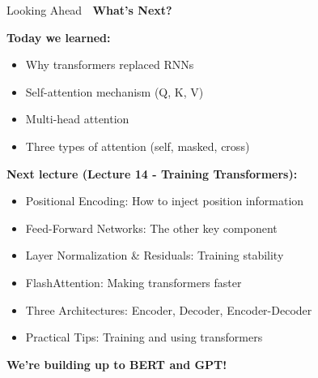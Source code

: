 \documentclass[aspectratio=169]{beamer}
\begin{document}
\begin{frame}[shrink=10]{Looking Ahead 🔮}
\textbf{What's Next?}

\vspace{1em}

\textbf{Today we learned:}
\begin{itemize}\setlength{\itemsep}{0pt}
    \item Why transformers replaced RNNs
    \item Self-attention mechanism (Q, K, V)
    \item Multi-head attention
    \item Three types of attention (self, masked, cross)
\end{itemize}

\vspace{1em}

\textbf{Next lecture (Lecture 14 - Training Transformers):}
\begin{itemize}\setlength{\itemsep}{0pt}
    \item \alert{Positional Encoding}: How to inject position information
    \item \alert{Feed-Forward Networks}: The other key component
    \item \alert{Layer Normalization \& Residuals}: Training stability
    \item \alert{FlashAttention}: Making transformers faster
    \item \alert{Three Architectures}: Encoder, Decoder, Encoder-Decoder
    \item \alert{Practical Tips}: Training and using transformers
\end{itemize}

\vspace{1em}

\begin{center}
\Large
\textbf{We're building up to BERT and GPT! 🚀}
\end{center}
\end{frame}
\end{document}
